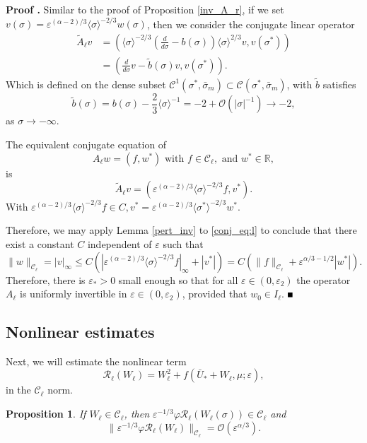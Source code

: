 \documentclass[letterpaper,11pt]{article}
\newcommand{\rmO}{\mathcal{O}}
\newcommand{\eps}{\varepsilon}
\newcommand{\Ral}{\mathcal{R}}
\numberwithin{equation}{section}
\theoremstyle{plain}
\newtheorem{Proposition}[Lemma]{Proposition}
\newenvironment{Proof}[1][\unskip]%
 {\begin{trivlist} \item[]{\bf Proof #1. }}%
 {\hspace*{\fill}$\rule{.4\baselineskip}{.4\baselineskip}$\end{trivlist}}
\begin{document}
\begin{Proof}
Similar to the proof of Proposition \ref{inv_A_r}, if we set $v(\sigma) =\eps^{(\alpha-2)/3} \langle\sigma \rangle^{-2/3}w(\sigma)$, then we consider the conjugate linear operator
\begin{align*}
\tilde{A}_\ell v &= \left( \langle \sigma\rangle^{-2/3}\left(\frac{d}{d\sigma}-b(\sigma)\right)\langle \sigma\rangle^{2/3} v, v(\sigma^*) \right) \\
&= \left( \frac{d}{d\sigma}v -\tilde{b}(\sigma)v, v(\sigma^*) \right).
\end{align*}
Which is defined on the dense subset $\mathcal{C}^1(\sigma^*, \bar{\sigma}_m) \subset \mathcal{C}(\sigma^*, \bar{\sigma}_m)$,
with $\tilde{b}$ satisfies 
\[
\tilde{b}(\sigma) = b(\sigma)-\frac{2}{3}\langle \sigma\rangle^{-1} =-2 + \rmO(|\sigma|^{-1}) \to -2, 
\]
as $\sigma \to -\infty$. 

The equivalent conjugate equation of 
\[
A_\ell w = (f,w^*) \text{ with } f \in \mathcal{C}_\ell, \text{ and }w^* \in \mathbb{R} , 
\] is 
\begin{equation}\label{conj_eq:l}
\tilde{A}_\ell v = (\eps^{(\alpha-2)/3}\langle \sigma \rangle^{-2/3} f,v^*).
\end{equation}
With $\eps^{(\alpha-2)/3}\langle \sigma \rangle^{-2/3} f \in C, v^* = \eps^{(\alpha-2)/3}\langle \sigma^* \rangle^{-2/3} w^*$.

Therefore, we may apply Lemma \ref{pert_inv} to \eqref{conj_eq:l} to conclude that there exist a constant $C$ independent of $\eps$ such that
\begin{equation}\label{linear_est:l}
\|w\|_{\mathcal{C}_\ell} = |v|_\infty \le C(|\eps^{(\alpha-2)/3}\langle \sigma \rangle^{-2/3} f |_{\infty}+| v^*|) = C(\|f\|_{\mathcal{C}_\ell}+\eps^{\alpha/3-1/2}|w^*|).
\end{equation}
Therefore, there is $\eps_*>0$ small enough so that for all $\eps \in (0,\eps_2)$ the operator $A_\ell$ is uniformly invertible in $\eps \in (0, \eps_2)$, provided that $w_0 \in I_\ell$. 
\end{Proof}

\subsection{Nonlinear estimates}

Next, we will estimate the nonlinear term 
\[
\Ral_{\ell} (W_\ell)=W_\ell^2 + f(\bar{U}_*+W_\ell, \mu;\eps),
\]
 in the $\mathcal{C}_\ell$ norm. 
\begin{Proposition}\label{nl_est_l}
If $W_\ell \in \mathcal{C}_{\ell}$, then $ \eps^{-1/3}\varphi \Ral_\ell(W_\ell(\sigma))  \in \mathcal{C}_\ell$ and 
\begin{equation}\label{nl_est:Rl}
\| \eps^{-1/3}\varphi \Ral_\ell(W_\ell) \|_{\mathcal{C}_\ell} = \rmO(\eps^{\alpha/3}).
\end{equation}
\end{Proposition}
\end{document}
